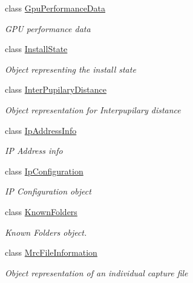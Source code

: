 \begin{DoxyCompactItemize}
class \hyperlink{class_microsoft_1_1_tools_1_1_windows_device_portal_1_1_device_portal_1_1_gpu_performance_data}{Gpu\+Performance\+Data}
\begin{DoxyCompactList}\small\item\em G\+PU performance data \end{DoxyCompactList}\item 
class \hyperlink{class_microsoft_1_1_tools_1_1_windows_device_portal_1_1_device_portal_1_1_install_state}{Install\+State}
\begin{DoxyCompactList}\small\item\em Object representing the install state \end{DoxyCompactList}\item 
class \hyperlink{class_microsoft_1_1_tools_1_1_windows_device_portal_1_1_device_portal_1_1_inter_pupilary_distance}{Inter\+Pupilary\+Distance}
\begin{DoxyCompactList}\small\item\em Object representation for Interpupilary distance \end{DoxyCompactList}\item 
class \hyperlink{class_microsoft_1_1_tools_1_1_windows_device_portal_1_1_device_portal_1_1_ip_address_info}{Ip\+Address\+Info}
\begin{DoxyCompactList}\small\item\em IP Address info \end{DoxyCompactList}\item 
class \hyperlink{class_microsoft_1_1_tools_1_1_windows_device_portal_1_1_device_portal_1_1_ip_configuration}{Ip\+Configuration}
\begin{DoxyCompactList}\small\item\em IP Configuration object \end{DoxyCompactList}\item 
class \hyperlink{class_microsoft_1_1_tools_1_1_windows_device_portal_1_1_device_portal_1_1_known_folders}{Known\+Folders}
\begin{DoxyCompactList}\small\item\em Known Folders object. \end{DoxyCompactList}\item 
class \hyperlink{class_microsoft_1_1_tools_1_1_windows_device_portal_1_1_device_portal_1_1_mrc_file_information}{Mrc\+File\+Information}
\begin{DoxyCompactList}\small\item\em Object representation of an individual capture file \end{DoxyCompactList}\item 

\end{DoxyCompactItemize}
